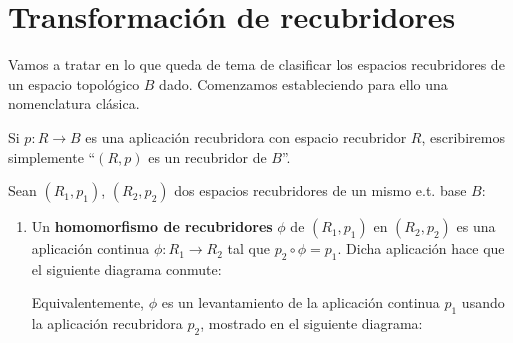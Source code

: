 \section{Transformación de recubridores}

Vamos a tratar en lo que queda de tema de clasificar los espacios recubridores de un espacio topológico $B$ dado. Comenzamos estableciendo para ello una nomenclatura clásica.

\begin{notacion}
    Si $p:R\to B$ es una aplicación recubridora con espacio recubridor $R$, escribiremos simplemente ``$(R,p)$ es un recubridor de $B$''.
\end{notacion}

\begin{definicion}
    Sean $(R_1,p_1)$, $(R_2,p_2)$ dos espacios recubridores de un mismo e.t. base $B$:
    \begin{center}
    \end{center}
    \begin{enumerate}
        \item Un \textbf{homomorfismo de recubridores} $\phi$ de $(R_1,p_1)$ en $(R_2,p_2)$ es una aplicación continua $\phi:R_1 \to R_2$  tal que $p_2 \circ \phi = p_1$. Dicha aplicación hace que el siguiente diagrama conmute:
        \begin{center}
        \end{center}
        
        Equivalentemente, $\phi$ es un levantamiento de la aplicación continua $p_1$ usando la aplicación recubridora $p_2$, mostrado en el siguiente diagrama:
        \begin{center}
        \end{center}


\end{enumerate}
\end{definicion}
